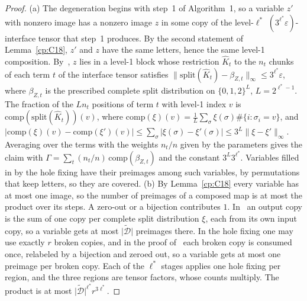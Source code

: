 \documentclass[11pt]{article}
\theoremstyle{definition}
\theoremstyle{remark}
\providecommand{\eps}{\varepsilon}
\newcommand{\abs}[1]{\lvert #1\rvert}
\newcommand{\norm}[1]{\lVert#1\rVert}
\begin{document}
\begin{proof}
(a) The degeneration begins with step~1 of Algorithm~1, so a variable $z'$ with nonzero image has a nonzero image $z$ in some copy of the level-$\ell^*$ $(3^{\ell^*}\eps)$-interface tensor that step~1 produces. By the second statement of Lemma~\ref{cp:C18}, $z'$ and $z$ have the same letters, hence the same level-1 composition. By~\cite[Definitions~3.6 and~4.1]{VXXZ24}, $z$ lies in a level-1 block whose restriction $\hat K_t$ to the $n_t$ chunks of each term $t$ of the interface tensor satisfies $\norm{\mathrm{split}(\hat K_t)-\beta_{Z,t}}_\infty\le3^{\ell^*}\eps$, where $\beta_{Z,t}$ is the prescribed complete split distribution on $\{0,1,2\}^L$, $L=2^{\ell^*-1}$. The fraction of the $Ln_t$ positions of term $t$ with level-1 index $v$ is $\mathrm{comp}(\mathrm{split}(\hat K_t))(v)$, where $\mathrm{comp}(\xi)(v)=\frac1L\sum_\sigma\xi(\sigma)\#\{i:\sigma_i=v\}$, and $\abs{\mathrm{comp}(\xi)(v)-\mathrm{comp}(\xi')(v)}\le\sum_\sigma\abs{\xi(\sigma)-\xi'(\sigma)}\le3^L\norm{\xi-\xi'}_\infty$. Averaging over the terms with the weights $n_t/n$ given by the parameters gives the claim with $\Gamma=\sum_t(n_t/n)\,\mathrm{comp}(\beta_{Z,t})$ and the constant $3^L3^{\ell^*}$. Variables filled in by the hole fixing have their preimages among such variables, by permutations that keep letters, so they are covered.
(b) By Lemma~\ref{cp:C18} every variable has at most one image, so the number of preimages of a composed map is at most the product over its steps. A zero-out or a bijection contributes $1$. In~\cite[Theorems~5.3 and~6.3]{VXXZ24} an output copy is the sum of one copy per complete split distribution $\xi$, each from its own input copy, so a variable gets at most $\abs{\tilde{\mathcal D}}$ preimages there. In the hole fixing one may use exactly $r$ broken copies, and in the proof of~\cite[Theorem~7.2]{VXXZ24} each broken copy is consumed once, relabeled by a bijection and zeroed out, so a variable gets at most one preimage per broken copy. Each of the $\ell^*$ stages applies one hole fixing per region, and the three regions are tensor factors, whose counts multiply. The product is at most $\abs{\tilde{\mathcal D}}^{\ell^*}r^{3\ell^*}$.

\end{proof}
\end{document}
